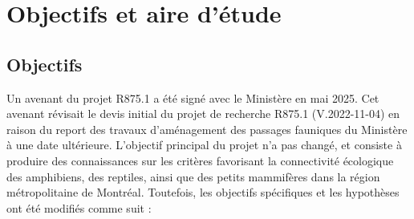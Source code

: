 \section{Objectifs et aire d'étude}

\subsection{Objectifs}

Un avenant du projet R875.1 a été signé avec le Ministère en mai 2025. Cet avenant révisait le devis initial du projet de recherche R875.1 (V.2022-11-04) en raison du report des travaux d'aménagement des passages fauniques du Ministère à une date ultérieure. L'objectif principal du projet n'a pas changé, et consiste à produire des connaissances sur les critères favorisant la connectivité écologique des amphibiens, des reptiles, ainsi que des petits mammifères dans la région métropolitaine de Montréal. Toutefois, les objectifs spécifiques et les hypothèses ont été modifiés comme suit :

